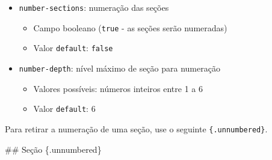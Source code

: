 \documentclass[
  10pt,
  ignorenonframetext,
]{beamer}
\newenvironment{Shaded}{\begin{snugshade}}{\end{snugshade}}
\newcommand{\FunctionTok}[1]{\textcolor[rgb]{0.28,0.35,0.67}{#1}}
\providecommand{\tightlist}{%
  \setlength{\itemsep}{0pt}\setlength{\parskip}{0pt}}\usepackage{longtable,booktabs,array}
\begin{document}
\begin{frame}[fragile]
\begin{itemize}
\tightlist
\item
  \texttt{number-sections}: numeração das seções

  \begin{itemize}
  \tightlist
  \item
    Campo booleano (\texttt{true} - as seções serão numeradas)
  \item
    Valor \texttt{default}: \texttt{false}
  \end{itemize}
\item
  \texttt{number-depth}: nível máximo de seção para numeração

  \begin{itemize}
  \tightlist
  \item
    Valores possíveis: números inteiros entre 1 a 6
  \item
    Valor \texttt{default}: 6
  \end{itemize}
\end{itemize}

Para retirar a numeração de uma seção, use o seguinte
\texttt{\{.unnumbered\}}.

\begin{Shaded}
\begin{Highlighting}[]
\FunctionTok{\#\# Seção \{.unnumbered\}}
\end{Highlighting}
\end{Shaded}
\end{frame}
\end{document}
